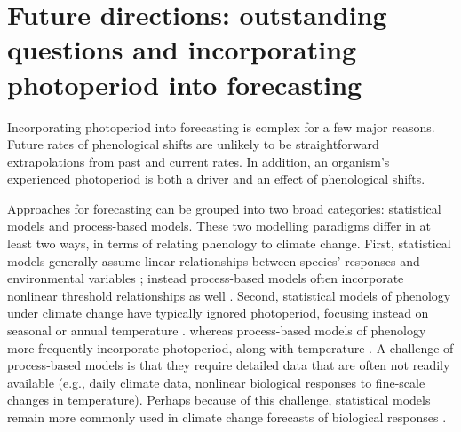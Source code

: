 \documentclass{article}
\begin{document}
\section*{Future directions: outstanding questions and incorporating photoperiod into forecasting}
\par  Incorporating photoperiod into forecasting is complex for a few major reasons. Future rates of phenological shifts are unlikely to be straightforward extrapolations from past and current rates. In addition, an organism's experienced photoperiod is both a driver and an effect of phenological shifts. 

\par Approaches for forecasting can be grouped into two broad categories: statistical models and process-based models. These two modelling paradigms differ in at least two ways, in terms of relating phenology to climate change. First, statistical models generally assume linear relationships between species' responses and environmental variables \citep[e.g., ][]{flynn2018,van2007,ibanez2010}; instead process-based models often incorporate nonlinear threshold relationships as well \citep[e.g.][]{chuine2001,morin2009,xie1989}. Second, statistical models of phenology under climate change have typically ignored photoperiod, focusing instead on seasonal or annual temperature \citep[e.g.][but see \citet{richardson2013}]{diez2012,ibanez2010,van2007}. %
whereas process-based models of phenology more frequently incorporate photoperiod, along with temperature \citep{lundell2020,duputie2015,morin2009,xie1989,zhao2013,}. A challenge of process-based models is that they require detailed data that are often not readily available (e.g., daily climate data, nonlinear biological responses to fine-scale changes in temperature). Perhaps because of this challenge, statistical models remain more commonly used in climate change forecasts of biological responses \citep[e.g.,][]{Basler:2012,diez2012,garcia2016,ibanez2010,van2007,zhu2012}.
\end{document}
